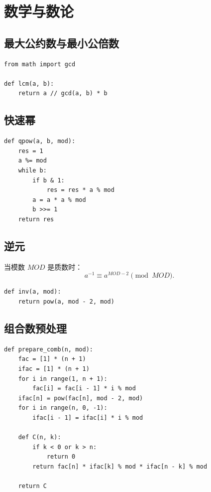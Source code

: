 \documentclass[UTF8,a4paper,14pt]{ctexart}
\begin{document}
\section{数学与数论}

\subsection{最大公约数与最小公倍数}

\begin{lstlisting}
from math import gcd

def lcm(a, b):
    return a // gcd(a, b) * b
\end{lstlisting}

\subsection{快速幂}

\begin{lstlisting}
def qpow(a, b, mod):
    res = 1
    a %= mod
    while b:
        if b & 1:
            res = res * a % mod
        a = a * a % mod
        b >>= 1
    return res
\end{lstlisting}

\subsection{逆元}

当模数 $MOD$ 是质数时：
\[
a^{-1}\equiv a^{MOD-2}\pmod{MOD}.
\]

\begin{lstlisting}
def inv(a, mod):
    return pow(a, mod - 2, mod)
\end{lstlisting}

\subsection{组合数预处理}

\begin{lstlisting}
def prepare_comb(n, mod):
    fac = [1] * (n + 1)
    ifac = [1] * (n + 1)
    for i in range(1, n + 1):
        fac[i] = fac[i - 1] * i % mod
    ifac[n] = pow(fac[n], mod - 2, mod)
    for i in range(n, 0, -1):
        ifac[i - 1] = ifac[i] * i % mod

    def C(n, k):
        if k < 0 or k > n:
            return 0
        return fac[n] * ifac[k] % mod * ifac[n - k] % mod

    return C
\end{lstlisting}
\end{document}
